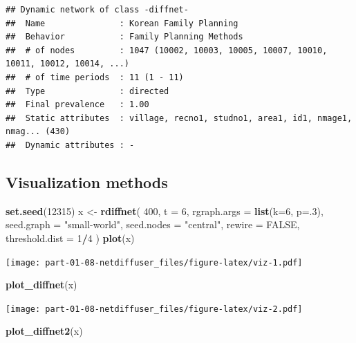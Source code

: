 \documentclass[]{book}
\newenvironment{Shaded}{\begin{snugshade}}{\end{snugshade}}
\newcommand{\DataTypeTok}[1]{\textcolor[rgb]{0.13,0.29,0.53}{#1}}
\newcommand{\DecValTok}[1]{\textcolor[rgb]{0.00,0.00,0.81}{#1}}
\newcommand{\KeywordTok}[1]{\textcolor[rgb]{0.13,0.29,0.53}{\textbf{#1}}}
\newcommand{\NormalTok}[1]{#1}
\newcommand{\OperatorTok}[1]{\textcolor[rgb]{0.81,0.36,0.00}{\textbf{#1}}}
\newcommand{\OtherTok}[1]{\textcolor[rgb]{0.56,0.35,0.01}{#1}}
\newcommand{\StringTok}[1]{\textcolor[rgb]{0.31,0.60,0.02}{#1}}
\begin{document}
\begin{itemize}
\begin{verbatim}
## Dynamic network of class -diffnet-
##  Name               : Korean Family Planning
##  Behavior           : Family Planning Methods
##  # of nodes         : 1047 (10002, 10003, 10005, 10007, 10010, 10011, 10012, 10014, ...)
##  # of time periods  : 11 (1 - 11)
##  Type               : directed
##  Final prevalence   : 1.00
##  Static attributes  : village, recno1, studno1, area1, id1, nmage1, nmag... (430)
##  Dynamic attributes : -
\end{verbatim}
\end{itemize}

\hypertarget{visualization-methods}{%
\subsection{Visualization methods}\label{visualization-methods}}

\begin{Shaded}
\begin{Highlighting}[]
\KeywordTok{set.seed}\NormalTok{(}\DecValTok{12315}\NormalTok{)}
\NormalTok{x <-}\StringTok{ }\KeywordTok{rdiffnet}\NormalTok{(}
  \DecValTok{400}\NormalTok{, }\DataTypeTok{t =} \DecValTok{6}\NormalTok{, }\DataTypeTok{rgraph.args =} \KeywordTok{list}\NormalTok{(}\DataTypeTok{k=}\DecValTok{6}\NormalTok{, }\DataTypeTok{p=}\NormalTok{.}\DecValTok{3}\NormalTok{),}
  \DataTypeTok{seed.graph =} \StringTok{"small-world"}\NormalTok{,}
  \DataTypeTok{seed.nodes =} \StringTok{"central"}\NormalTok{, }\DataTypeTok{rewire =} \OtherTok{FALSE}\NormalTok{, }\DataTypeTok{threshold.dist =} \DecValTok{1}\OperatorTok{/}\DecValTok{4}
\NormalTok{  )}
\KeywordTok{plot}\NormalTok{(x)}
\end{Highlighting}
\end{Shaded}

\texttt{[image: part-01-08-netdiffuser\_files/figure-latex/viz-1.pdf]}

\begin{Shaded}
\begin{Highlighting}[]
\KeywordTok{plot_diffnet}\NormalTok{(x)}
\end{Highlighting}
\end{Shaded}

\texttt{[image: part-01-08-netdiffuser\_files/figure-latex/viz-2.pdf]}

\begin{Shaded}
\begin{Highlighting}[]
\KeywordTok{plot_diffnet2}\NormalTok{(x)}
\end{Highlighting}
\end{Shaded}
\end{document}
